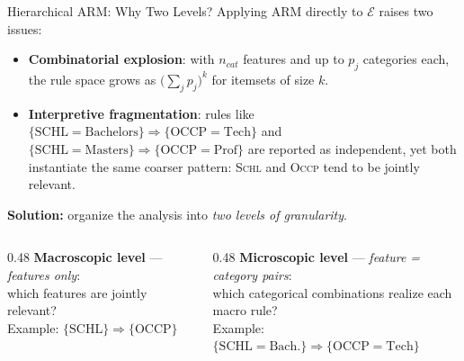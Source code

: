 \documentclass[10pt,aspectratio=169]{beamer}
\begin{document}
\begin{frame}{Hierarchical ARM: Why Two Levels?}
  Applying ARM directly to $\mathcal{E}$ raises two issues:
  \begin{itemize}\small
    \item \textbf{Combinatorial explosion}: with $n_{cat}$ features and up to $p_j$ categories each, the rule space grows as $\bigl(\sum_j p_j\bigr)^k$ for itemsets of size $k$.
    \item \textbf{Interpretive fragmentation}: rules like $\{\mathrm{SCHL{=}Bachelors}\} \Rightarrow \{\mathrm{OCCP{=}Tech}\}$ and $\{\mathrm{SCHL{=}Masters}\} \Rightarrow \{\mathrm{OCCP{=}Prof}\}$ are reported as independent, yet both instantiate the same coarser pattern: \textsc{Schl} and \textsc{Occp} tend to be jointly relevant.
  \end{itemize}
  \vspace{4pt}
  \begin{tcolorbox}[colback=parthenopeaccent!25,colframe=parthenopenavy,boxrule=0.5pt,arc=1pt]
    \textbf{Solution:} organize the analysis into \emph{two levels of granularity}.
    \begin{columns}[T,onlytextwidth]
      \begin{column}{0.48\textwidth}
        \small\textbf{Macroscopic level} --- \emph{features only}:\\
        \textcolor{highlightorange}{which features} are jointly relevant?\\[2pt]
        Example: $\{\mathrm{SCHL}\} \Rightarrow \{\mathrm{OCCP}\}$
      \end{column}
      \begin{column}{0.48\textwidth}
        \small\textbf{Microscopic level} --- \emph{feature = category pairs}:\\
        \textcolor{highlightorange}{which categorical combinations} realize each macro rule?\\[2pt]
        Example: $\{\mathrm{SCHL{=}Bach.}\} \Rightarrow \{\mathrm{OCCP{=}Tech}\}$
      \end{column}
    \end{columns}
  \end{tcolorbox}
\end{frame}
\end{document}
